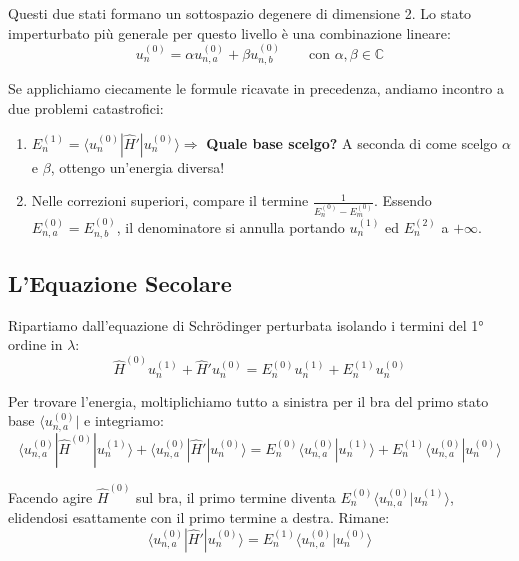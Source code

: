 \documentclass[11pt, a4paper]{article}
\begin{document}
\noindent
Questi due stati formano un sottospazio degenere di dimensione 2. Lo stato imperturbato più generale per questo livello è una combinazione lineare:
\begin{equation}
    u_n^{(0)} = \alpha u_{n,a}^{(0)} + \beta u_{n,b}^{(0)} \qquad \text{con } \alpha, \beta \in \mathbb{C} %
\end{equation}

\noindent
Se applichiamo ciecamente le formule ricavate in precedenza, andiamo incontro a due problemi catastrofici:
\begin{enumerate}
    \item $E_n^{(1)} = \langle u_n^{(0)} | \hat{H}' | u_n^{(0)} \rangle \Rightarrow$ \textbf{Quale base scelgo?} A seconda di come scelgo $\alpha$ e $\beta$, ottengo un'energia diversa!
    \item Nelle correzioni superiori, compare il termine $\frac{1}{E_n^{(0)} - E_m^{(0)}}$. Essendo $E_{n,a}^{(0)} = E_{n,b}^{(0)}$, il denominatore si annulla portando $u_n^{(1)}$ ed $E_n^{(2)}$ a $+\infty$.
\end{enumerate}

\subsection{L'Equazione Secolare} %

Ripartiamo dall'equazione di Schrödinger perturbata isolando i termini del 1° ordine in $\lambda$:
\begin{equation*}
    \hat{H}^{(0)} u_n^{(1)} + \hat{H}' u_n^{(0)} = E_n^{(0)} u_n^{(1)} + E_n^{(1)} u_n^{(0)} %
\end{equation*}

\noindent
Per trovare l'energia, moltiplichiamo tutto a sinistra per il bra del primo stato base $\langle u_{n,a}^{(0)} |$ e integriamo:
\begin{equation*}
    \langle u_{n,a}^{(0)} | \hat{H}^{(0)} | u_n^{(1)} \rangle + \langle u_{n,a}^{(0)} | \hat{H}' | u_n^{(0)} \rangle = E_n^{(0)} \langle u_{n,a}^{(0)} | u_n^{(1)} \rangle + E_n^{(1)} \langle u_{n,a}^{(0)} | u_n^{(0)} \rangle %
\end{equation*}

\noindent
Facendo agire $\hat{H}^{(0)}$ sul bra, il primo termine diventa $E_n^{(0)} \langle u_{n,a}^{(0)} | u_n^{(1)} \rangle$, elidendosi esattamente con il primo termine a destra. Rimane:
\begin{equation*}
    \langle u_{n,a}^{(0)} | \hat{H}' | u_n^{(0)} \rangle = E_n^{(1)} \langle u_{n,a}^{(0)} | u_n^{(0)} \rangle %
\end{equation*}
\end{document}

